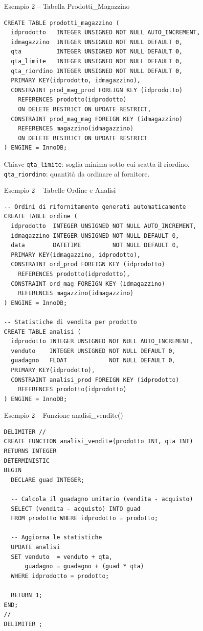 \documentclass[aspectratio=169]{beamer}
\begin{document}
\begin{frame}[fragile]{Esempio 2 -- Tabella Prodotti\_Magazzino}
  \begin{lstlisting}[style=sqlstyle]
CREATE TABLE prodotti_magazzino (
  idprodotto   INTEGER UNSIGNED NOT NULL AUTO_INCREMENT,
  idmagazzino  INTEGER UNSIGNED NOT NULL DEFAULT 0,
  qta          INTEGER UNSIGNED NOT NULL DEFAULT 0,
  qta_limite   INTEGER UNSIGNED NOT NULL DEFAULT 0,
  qta_riordino INTEGER UNSIGNED NOT NULL DEFAULT 0,
  PRIMARY KEY(idprodotto, idmagazzino),
  CONSTRAINT prod_mag_prod FOREIGN KEY (idprodotto)
    REFERENCES prodotto(idprodotto)
    ON DELETE RESTRICT ON UPDATE RESTRICT,
  CONSTRAINT prod_mag_mag FOREIGN KEY (idmagazzino)
    REFERENCES magazzino(idmagazzino)
    ON DELETE RESTRICT ON UPDATE RESTRICT
) ENGINE = InnoDB;
  \end{lstlisting}
  \begin{block}{Chiave}
    \texttt{qta\_limite}: soglia minima sotto cui scatta il riordino.\\
    \texttt{qta\_riordino}: quantità da ordinare al fornitore.
  \end{block}
\end{frame}

\begin{frame}[fragile]{Esempio 2 -- Tabelle Ordine e Analisi}
  \begin{lstlisting}[style=sqlstyle]
-- Ordini di rifornitamento generati automaticamente
CREATE TABLE ordine (
  idprodotto  INTEGER UNSIGNED NOT NULL AUTO_INCREMENT,
  idmagazzino INTEGER UNSIGNED NOT NULL DEFAULT 0,
  data        DATETIME         NOT NULL DEFAULT 0,
  PRIMARY KEY(idmagazzino, idprodotto),
  CONSTRAINT ord_prod FOREIGN KEY (idprodotto)
    REFERENCES prodotto(idprodotto),
  CONSTRAINT ord_mag FOREIGN KEY (idmagazzino)
    REFERENCES magazzino(idmagazzino)
) ENGINE = InnoDB;

-- Statistiche di vendita per prodotto
CREATE TABLE analisi (
  idprodotto INTEGER UNSIGNED NOT NULL AUTO_INCREMENT,
  venduto    INTEGER UNSIGNED NOT NULL DEFAULT 0,
  guadagno   FLOAT            NOT NULL DEFAULT 0,
  PRIMARY KEY(idprodotto),
  CONSTRAINT analisi_prod FOREIGN KEY (idprodotto)
    REFERENCES prodotto(idprodotto)
) ENGINE = InnoDB;
  \end{lstlisting}
\end{frame}

\begin{frame}[fragile]{Esempio 2 -- Funzione analisi\_vendite()}
  \begin{lstlisting}[style=sqlstyle]
DELIMITER //
CREATE FUNCTION analisi_vendite(prodotto INT, qta INT)
RETURNS INTEGER
DETERMINISTIC
BEGIN
  DECLARE guad INTEGER;

  -- Calcola il guadagno unitario (vendita - acquisto)
  SELECT (vendita - acquisto) INTO guad
  FROM prodotto WHERE idprodotto = prodotto;

  -- Aggiorna le statistiche
  UPDATE analisi
  SET venduto  = venduto + qta,
      guadagno = guadagno + (guad * qta)
  WHERE idprodotto = prodotto;

  RETURN 1;
END;
//
DELIMITER ;
  \end{lstlisting}
\end{frame}
\end{document}
